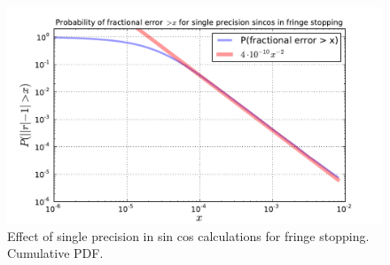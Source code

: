 \documentclass[a4paper,twoside, 10pt]{report}
\begin{document}
\begin{figure}
\begin{center}
\includegraphics[width=\textwidth]{L189429-1x1-single-vs-double-sincos-cum-pdf.pdf}
\end{center}
\caption{Effect of single precision in sin cos calculations for
  fringe stopping. Cumulative PDF.}
\label{fig:single-vs-double-cumulative-pdf}
\end{figure}
\end{document}
